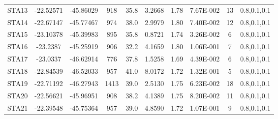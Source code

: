 \begin{table}[!ht]
\begin{center}
\begin{tabular}{| c | c | c | c | c | c | c | c | c | c |}
STA13 & -22.52571 & -45.86029 & 918 & 35.8 & 3.2668 & 1.78 & 7.67E-002 & 13 & 0.8,0.1,0.1\\
STA14 & -22.67147 & -45.77467 & 974 & 38.0 & 2.9979 & 1.80 & 7.40E-002 & 12 & 0.8,0.1,0.1\\
STA15 & -23.10378 & -45.39983 & 895 & 35.8 & 0.8721 & 1.74 & 3.26E-002 & 6 & 0.8,0.1,0.1\\
STA16 & -23.2387 & -45.25919 & 906 & 32.2 & 4.1659 & 1.80 & 1.06E-001 & 7 & 0.8,0.1,0.1\\
STA17 & -23.0337 & -46.62914 & 776 & 37.8 & 1.5258 & 1.69 & 4.39E-002 & 6 & 0.8,0.1,0.1\\
STA18 & -22.84539 & -46.52033 & 957 & 41.0 & 8.0172 & 1.72 & 1.32E-001 & 5 & 0.8,0.1,0.1\\
STA19 & -22.71192 & -46.27943 & 1413 & 39.0 & 2.5130 & 1.75 & 6.23E-002 & 18 & 0.8,0.1,0.1\\
STA20 & -22.56621 & -45.96951 & 908 & 38.2 & 4.1389 & 1.75 & 8.20E-002 & 11 & 0.8,0.1,0.1\\
STA21 & -22.39548 & -45.75364 & 957 & 39.0 & 4.8590 & 1.72 & 1.07E-001 & 9 & 0.8,0.1,0.1\\
\hline
\end{tabular}
\end{center}
\end{table}
